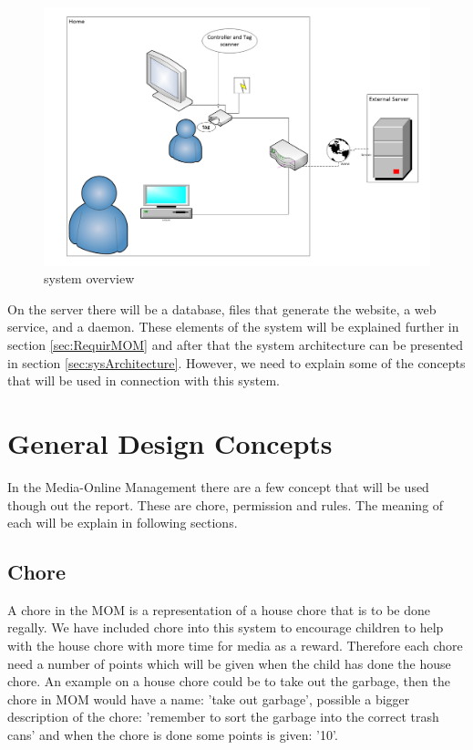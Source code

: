 \begin{figure}
	\centering
		\includegraphics[width=1.00\textwidth]{images/systemoverview.jpg}
	\caption{system overview}
	\label{fig:systemoverview}
\end{figure}

On the server there will be a database, files that generate the website, a web service, and a daemon. These elements of the system will be explained further in section \vref{sec:RequirMOM} and after that the system architecture can be presented in section \vref{sec:sysArchitecture}. However, we need to explain some of the concepts that will be used in connection with this system.

\section{General Design Concepts}
In the Media-Online Management there are a few concept that will be used though out the report. These are chore, permission and rules. The meaning of each will be explain in following sections.

\subsection{Chore}
A chore in the MOM is a representation of a house chore that is to be done regally. We have included chore into this system to encourage children to help with the house chore with more time for media as a reward. Therefore each chore need a number of points which will be given when the child has done the house chore. 
An example on a house chore could be to take out the garbage, then the chore in MOM would have a name: 'take out garbage', possible a bigger description of the chore: 'remember to sort the garbage into the correct trash cans' and when the chore is done some points is given: '10'.  

